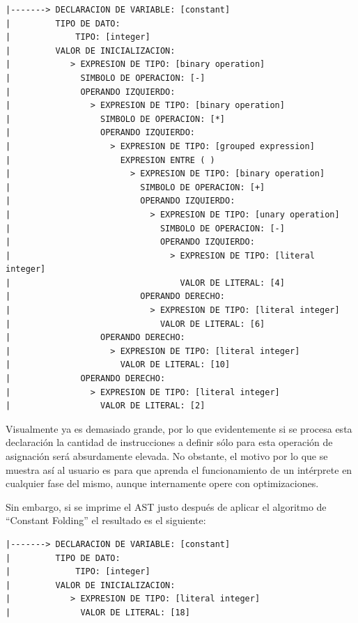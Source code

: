 \begin{verbatim}
|-------> DECLARACION DE VARIABLE: [constant]
|         TIPO DE DATO:
|             TIPO: [integer]
|         VALOR DE INICIALIZACION:
|            > EXPRESION DE TIPO: [binary operation]
|              SIMBOLO DE OPERACION: [-]
|              OPERANDO IZQUIERDO:
|                > EXPRESION DE TIPO: [binary operation]
|                  SIMBOLO DE OPERACION: [*]
|                  OPERANDO IZQUIERDO:
|                    > EXPRESION DE TIPO: [grouped expression]
|                      EXPRESION ENTRE ( )
|                        > EXPRESION DE TIPO: [binary operation]
|                          SIMBOLO DE OPERACION: [+]
|                          OPERANDO IZQUIERDO:
|                            > EXPRESION DE TIPO: [unary operation]
|                              SIMBOLO DE OPERACION: [-]
|                              OPERANDO IZQUIERDO:
|                                > EXPRESION DE TIPO: [literal integer]
|                                  VALOR DE LITERAL: [4]
|                          OPERANDO DERECHO:
|                            > EXPRESION DE TIPO: [literal integer]
|                              VALOR DE LITERAL: [6]
|                  OPERANDO DERECHO:
|                    > EXPRESION DE TIPO: [literal integer]
|                      VALOR DE LITERAL: [10]
|              OPERANDO DERECHO:
|                > EXPRESION DE TIPO: [literal integer]
|                  VALOR DE LITERAL: [2]
\end{verbatim}

Visualmente ya es demasiado grande, por lo que evidentemente si se procesa esta declaración la cantidad de instrucciones a definir sólo para esta operación de asignación será absurdamente elevada. No obstante, el motivo por lo que se muestra así al usuario es para que aprenda el funcionamiento de un intérprete en cualquier fase del mismo, aunque internamente opere con optimizaciones.

\vspace{0.5cm}

Sin embargo, si se imprime el AST justo después de aplicar el algoritmo de ``Constant Folding'' el resultado es el siguiente:

\begin{verbatim}
|-------> DECLARACION DE VARIABLE: [constant]
|         TIPO DE DATO:
|             TIPO: [integer]
|         VALOR DE INICIALIZACION:
|            > EXPRESION DE TIPO: [literal integer]
|              VALOR DE LITERAL: [18]

\end{verbatim}

